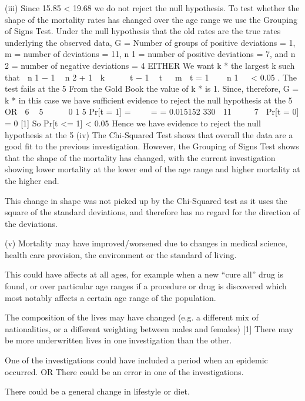 (iii)
Since 15.85 < 19.68 
we do not reject the null hypothesis. 
To test whether the shape of the mortality rates has changed over the age range we use
the Grouping of Signs Test.
Under the null hypothesis that the old rates are the true rates underlying
the observed data, 
G = Number of groups of positive deviations = 1,
m = number of deviations = 11,
n 1 = number of positive deviations = 7, and
n 2 = number of negative deviations = 4 
EITHER
We want k * the largest k such that
 n 1 − 1  n 2 + 1 
k 


 t − 1  t 
 m 
t = 1
 
 n 1 

< 0.05 .
The test fails at the 5%
From the Gold Book the value of k * is 1. 
Since, therefore, G = k * in this case 
we have sufficient evidence to reject the null hypothesis at the 5%
OR
 6  5 
  
0 1
5
Pr[t = 1] =    =
= 0.015152
330
 11 
 
 7 
Pr[t = 0] = 0 [1]
So Pr[t <= 1] < 0.05 
Hence we have evidence to reject the null hypothesis at the 5%
(iv)
The Chi-Squared Test shows that overall the data are a good fit to the previous
investigation. 
However, the Grouping of Signs Test shows that the shape of the mortality has
changed, 
with the current investigation showing lower mortality at the lower end of the age
range and higher mortality at the higher end.

This change in shape was not picked up by the Chi-Squared test as it uses the square
of the standard deviations, and therefore has no regard for the direction of the
deviations.

(v)
Mortality may have improved/worsened due to changes in medical science, health
care provision, the environment or the standard of living.

This could have affects at all ages, for example when a new “cure all” drug is found,
or over particular age ranges if a procedure or drug is discovered which most notably
affects a certain age range of the population.

The composition of the lives may have changed (e.g. a different mix of nationalities,
or a different weighting between males and females)
[1]
There may be more underwritten lives in one investigation than the other.

One of the investigations could have included a period when an epidemic occurred.
OR There could be an error in one of the investigations.

There could be a general change in lifestyle or diet.

